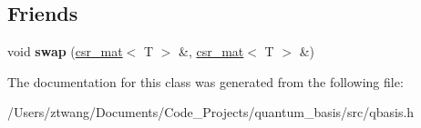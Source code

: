 \subsection*{Friends}
\begin{DoxyCompactItemize}
\item 
\mbox{\label{classqbasis_1_1csr__mat_afa8832c1ac943fd6538009ae544ac1f7}} 
void {\bfseries swap} (\hyperlink{classqbasis_1_1csr__mat}{csr\+\_\+mat}$<$ T $>$ \&, \hyperlink{classqbasis_1_1csr__mat}{csr\+\_\+mat}$<$ T $>$ \&)
\end{DoxyCompactItemize}


The documentation for this class was generated from the following file\+:\begin{DoxyCompactItemize}
\item 
/\+Users/ztwang/\+Documents/\+Code\+\_\+\+Projects/quantum\+\_\+basis/src/qbasis.\+h\end{DoxyCompactItemize}
